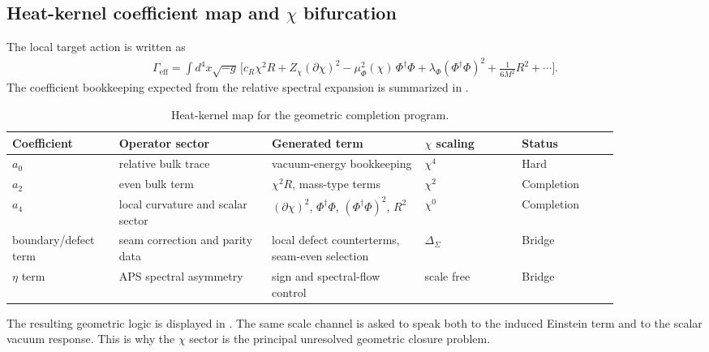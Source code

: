 \documentclass[11pt,a4paper]{article}
\theoremstyle{definition}
\theoremstyle{remark}
\newcommand{\Seam}{\Sigma}
\newcommand{\Gammaeff}{\Gamma_{\mathrm{eff}}}
\begin{document}
\subsection{Heat-kernel coefficient map and \texorpdfstring{$\chi$}{chi} bifurcation}

The local target action is written as
\begin{equation}
\label{eq:chi-effective-action}
\begin{aligned}
\Gammaeff
=
\int d^4x\sqrt{-g}\,
\Big[
c_R\chi^2R
+Z_\chi(\partial\chi)^2
-\mu_\Phi^2(\chi)\,\Phi^\dagger\Phi
+\lambda_\Phi(\Phi^\dagger\Phi)^2
+\frac{1}{6M^2}R^2
+\cdots
\Big].
\end{aligned}
\end{equation}
The coefficient bookkeeping expected from the relative spectral expansion is summarized in .

\begin{table}[t]
\centering
\small
\begin{tabularx}{\linewidth}{@{}>{\raggedright\arraybackslash}p{0.15\linewidth}>{\raggedright\arraybackslash}p{0.22\linewidth}>{\raggedright\arraybackslash}p{0.22\linewidth}>{\raggedright\arraybackslash}p{0.14\linewidth}>{\raggedright\arraybackslash}p{0.14\linewidth}@{}}
\toprule
Coefficient & Operator sector & Generated term & $\chi$ scaling & Status \\
\midrule
$a_0$ & relative bulk trace & vacuum-energy bookkeeping & $\chi^4$ & Hard \\
$a_2$ & even bulk term & $\chi^2R$, mass-type terms & $\chi^2$ & Completion \\
$a_4$ & local curvature and scalar sector & $(\partial\chi)^2$, $\Phi^\dagger\Phi$, $(\Phi^\dagger\Phi)^2$, $R^2$ & $\chi^0$ & Completion \\
boundary/defect term & seam correction and parity data & local defect counterterms, seam-even selection & $\Delta_{\Seam}$ & Bridge \\
$\eta$ term & APS spectral asymmetry & sign and spectral-flow control & scale free & Bridge \\
\bottomrule
\end{tabularx}
\caption{Heat-kernel map for the geometric completion program.}
\label{tab:heat-kernel-map}
\end{table}

The resulting geometric logic is displayed in . The same scale channel is asked to speak both to the induced Einstein term and to the scalar vacuum response. This is why the $\chi$ sector is the principal unresolved geometric closure problem.
\end{document}
